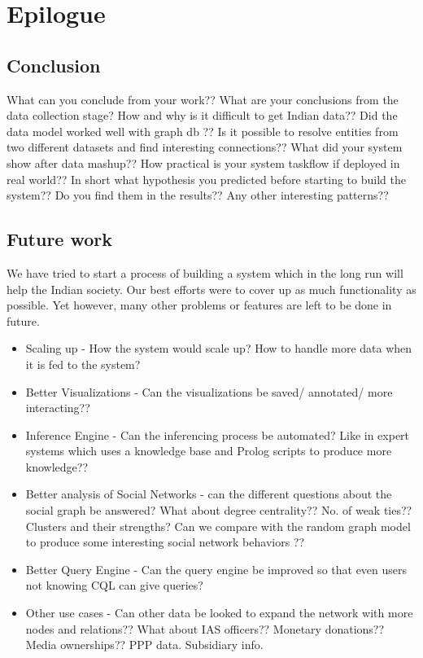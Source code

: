 \chapter{Epilogue}
\section{Conclusion}
What can you conclude from your work?? What are your conclusions from the data collection stage? How and why is it difficult to get Indian data?? Did the data model worked well with graph db ?? Is it possible to resolve entities from two different datasets and find interesting connections??  What did your system show after data mashup?? How practical is your system taskflow if deployed in real world?? In short what hypothesis you predicted before starting to build the system?? Do you find them in the results?? Any other interesting patterns?? 

\section{Future work}
We have tried to start a process of building a system which in the long run will help the Indian society. Our best efforts were to cover up as much functionality as possible. Yet however, many other problems or features are left to be done in future.
\begin{itemize}
\item Scaling up - How the system would scale up? How to handle more data when it is fed to the system?
\item Better Visualizations - Can the visualizations be saved/ annotated/ more interacting??
\item Inference Engine - Can the inferencing process be automated? Like in expert systems which uses a knowledge base and Prolog scripts to produce more knowledge??
\item Better analysis of Social Networks - can the different questions about the social graph be answered? What about degree centrality?? No. of weak ties?? Clusters and their strengths? Can we compare with the random graph model to produce some interesting social network behaviors ??
\item Better Query Engine - Can the query engine be improved so that even users not knowing CQL can give queries?
\item Other use cases - Can other data be looked to expand the network with more nodes and relations?? What about IAS officers?? Monetary donations?? Media ownerships?? PPP data. Subsidiary info. 
\end{itemize}
